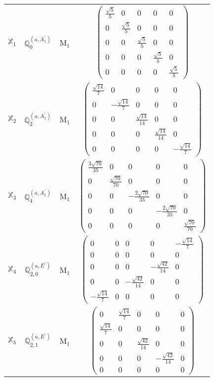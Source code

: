 \documentclass[fleqn,10pt,landscape]{article}
\begin{document}
\begin{itemize}
\begin{center}
\begin{longtable}{c|c|c|c}
$ \mathbb{X}_{1} $ & $\mathbb{Q}_{0}^{(a,A_{1}^{\prime})}$ & M$_{1}$ & $\begin{pmatrix} \frac{\sqrt{5}}{5} & 0 & 0 & 0 & 0 \\ 0 & \frac{\sqrt{5}}{5} & 0 & 0 & 0 \\ 0 & 0 & \frac{\sqrt{5}}{5} & 0 & 0 \\ 0 & 0 & 0 & \frac{\sqrt{5}}{5} & 0 \\ 0 & 0 & 0 & 0 & \frac{\sqrt{5}}{5} \end{pmatrix}$ \\
$ \mathbb{X}_{2} $ & $\mathbb{Q}_{2}^{(a,A_{1}^{\prime})}$ & M$_{1}$ & $\begin{pmatrix} \frac{\sqrt{14}}{7} & 0 & 0 & 0 & 0 \\ 0 & - \frac{\sqrt{14}}{7} & 0 & 0 & 0 \\ 0 & 0 & \frac{\sqrt{14}}{14} & 0 & 0 \\ 0 & 0 & 0 & \frac{\sqrt{14}}{14} & 0 \\ 0 & 0 & 0 & 0 & - \frac{\sqrt{14}}{7} \end{pmatrix}$ \\
$ \mathbb{X}_{3} $ & $\mathbb{Q}_{4}^{(a,A_{1}^{\prime})}$ & M$_{1}$ & $\begin{pmatrix} \frac{3 \sqrt{70}}{35} & 0 & 0 & 0 & 0 \\ 0 & \frac{\sqrt{70}}{70} & 0 & 0 & 0 \\ 0 & 0 & - \frac{2 \sqrt{70}}{35} & 0 & 0 \\ 0 & 0 & 0 & - \frac{2 \sqrt{70}}{35} & 0 \\ 0 & 0 & 0 & 0 & \frac{\sqrt{70}}{70} \end{pmatrix}$ \\
$ \mathbb{X}_{4} $ & $\mathbb{Q}_{2,0}^{(a,E^{\prime})}$ & M$_{1}$ & $\begin{pmatrix} 0 & 0 & 0 & 0 & - \frac{\sqrt{14}}{7} \\ 0 & 0 & 0 & 0 & 0 \\ 0 & 0 & 0 & - \frac{\sqrt{42}}{14} & 0 \\ 0 & 0 & - \frac{\sqrt{42}}{14} & 0 & 0 \\ - \frac{\sqrt{14}}{7} & 0 & 0 & 0 & 0 \end{pmatrix}$ \\
$ \mathbb{X}_{5} $ & $\mathbb{Q}_{2,1}^{(a,E^{\prime})}$ & M$_{1}$ & $\begin{pmatrix} 0 & \frac{\sqrt{14}}{7} & 0 & 0 & 0 \\ \frac{\sqrt{14}}{7} & 0 & 0 & 0 & 0 \\ 0 & 0 & \frac{\sqrt{42}}{14} & 0 & 0 \\ 0 & 0 & 0 & - \frac{\sqrt{42}}{14} & 0 \\ 0 & 0 & 0 & 0 & 0 \end{pmatrix}$ \\

\end{longtable}
\end{center}
\end{itemize}
\end{document}
